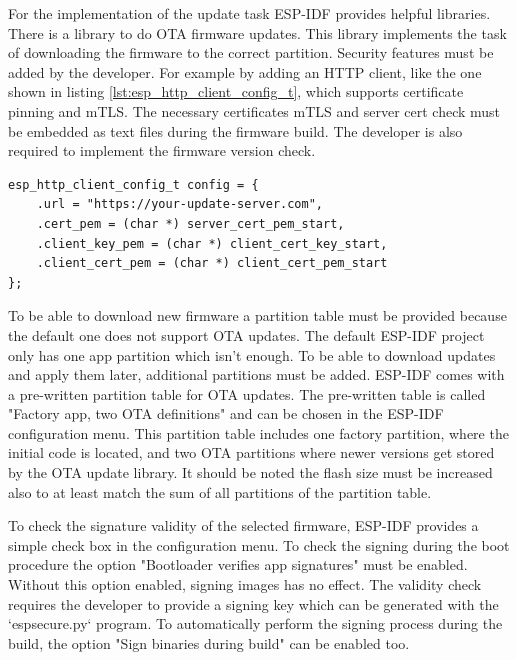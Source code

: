 For the implementation of the update task ESP-IDF provides helpful libraries. There is a library to do OTA firmware updates. This library implements the task of downloading the firmware to the correct partition. Security features must be added by the developer. For example by adding an HTTP client, like the one shown in listing \ref{lst:esp_http_client_config_t}, which supports certificate pinning and mTLS. The necessary certificates mTLS and server cert check must be embedded as text files during the firmware build. The developer is also required to implement the firmware version check.

\vspace{\baselineskip}
\begin{lstlisting}[caption={HTTP client},label={lst:esp_http_client_config_t},captionpos=b,frame=single]
esp_http_client_config_t config = {
    .url = "https://your-update-server.com",
    .cert_pem = (char *) server_cert_pem_start,
    .client_key_pem = (char *) client_cert_key_start,
    .client_cert_pem = (char *) client_cert_pem_start
};
\end{lstlisting}

To be able to download new firmware a partition table must be provided because the default one does not support OTA updates. The default ESP-IDF project only has one app partition which isn't enough. To be able to download updates and apply them later, additional partitions must be added. ESP-IDF comes with a pre-written partition table for OTA updates. The pre-written table is called "Factory app, two OTA definitions" and can be chosen in the ESP-IDF configuration menu. This partition table includes one factory partition, where the initial code is located, and two OTA partitions where newer versions get stored by the OTA update library. It should be noted the flash size must be increased also to at least match the sum of all partitions of the partition table.

\bigskip
To check the signature validity of the selected firmware, ESP-IDF provides a simple check box in the configuration menu. To check the signing during the boot procedure the option "Bootloader verifies app signatures" must be enabled. Without this option enabled, signing images has no effect. The validity check requires the developer to provide a signing key which can be generated with the `espsecure.py` program. To automatically perform the signing process during the build, the option "Sign binaries during build" can be enabled too. 

